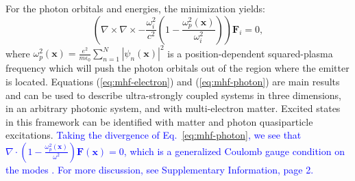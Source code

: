 \documentclass[aps,prl,twocolumn,
	groupedaddress,superscriptaddress,
	amsfonts,amssymb,amsmath,floatfix,
	citeautoscript]{revtex4-1}
\begin{document}
For the photon orbitals and energies, the minimization yields:
\begin{equation}
\left( \nabla\times\nabla\times - \frac{\omega_i^2}{c^2}\left(1-\frac{\omega_p^2(\mathbf{x})}{\omega_i^2} \right)\right)\mathbf{F}_i = 0,
\label{eq:mhf-photon}
\end{equation}
where $\omega_p^2(\mathbf{x}) = \frac{e^2}{m\epsilon_0}\sum\limits_{n=1}^N |\psi_n(\mathbf{x})|^2$ is a position-dependent squared-plasma frequency which will push the photon orbitals out of the region where the emitter is located. Equations (\ref{eq:mhf-electron}) and (\ref{eq:mhf-photon}) are main results and can be used to describe ultra-strongly coupled systems in three dimensions, in an arbitrary photonic system, and with multi-electron matter. Excited states in this framework can be identified with matter and photon quasiparticle excitations. \textcolor{blue}{Taking the divergence of Eq.~\ref{eq:mhf-photon}, we see that $\nabla\cdot(1-\frac{\omega_p^2(\mathbf{x})}{\omega^2})\mathbf{F}(\mathbf{x})=0$, which is a generalized Coulomb gauge condition on the modes \cite{glauber1991quantum}. For more discussion, see Supplementary Information, page 2.}
\end{document}
